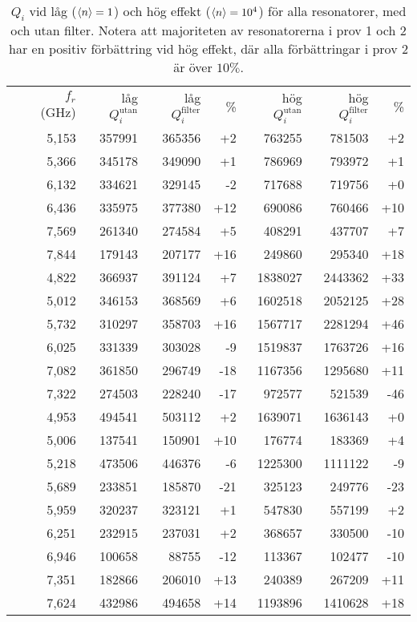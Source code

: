 \documentclass[main.tex]{subfiles}
\begin{document}
\begin{table}[h]
\centering
\caption{$Q_i$ vid låg ($\expval{n}=1$) och hög effekt ($\expval{n}=10^4$) för alla resonatorer, med och utan filter. Notera att majoriteten av resonatorerna i prov 1 och 2 har en positiv förbättring vid hög effekt, där alla förbättringar i prov 2 är över $10 \%$.}
\label{tab:Qi_A}


\begin{tabular}{crrrrrrr}
\toprule
 & $f_r$ (\unit{GHz}) & låg $Q_i^{\text{utan}}$ & låg $Q_i^{\text{filter}}$ &  \% & hög $Q_i^{\text{utan}}$ & hög $Q_i^{\text{filter}}$ &  \% \\
\cmidrule{2-8}

\parbox[t]{2mm}{}
& 5,153 & 357991 & 365356 & +2 & 763255 & 781503 & +2 \\
 & 5,366 & 345178 & 349090 & +1 & 786969 & 793972 & +1 \\ 
 & 6,132 & 334621 & 329145 & -2 & 717688 & 719756 & +0 \\ 
 & 6,436 & 335975 & 377380 & +12 & 690086 & 760466 & +10 \\ 
 & 7,569 & 261340 & 274584 & +5 & 408291 & 437707 & +7 \\
 & 7,844 & 179143 & 207177 & +16 & 249860 & 295340 & +18\\

\parbox[t]{2mm}{}
& 4,822 & 366937 & 391124 & +7 & 1838027 & 2443362 & +33 \\
& 5,012 & 346153 & 368569 & +6 & 1602518 & 2052125 & +28 \\
& 5,732 & 310297 & 358703 & +16 & 1567717 & 2281294 & +46 \\
& 6,025 & 331339 & 303028 & -9 & 1519837 & 1763726 & +16 \\
& 7,082 & 361850 & 296749 & -18 & 1167356 & 1295680 & +11 \\
& 7,322 & 274503 & 228240 & -17 & 972577 & 521539 & -46 \\

\parbox[t]{2mm}{}
& 4,953 & 494541 & 503112 & +2 & 1639071 & 1636143 & +0 \\
& 5,006 & 137541 & 150901 & +10 & 176774 & 183369 & +4 \\
& 5,218 & 473506 & 446376 & -6 & 1225300 & 1111122 & -9 \\
& 5,689 & 233851 & 185870 & -21 & 325123 & 249776 & -23 \\
& 5,959 & 320237 & 323121 & +1 & 547830 & 557199 & +2 \\
& 6,251 & 232915 & 237031 & +2 & 368657 & 330500 & -10 \\
& 6,946 & 100658 & 88755 & -12 & 113367 & 102477 & -10 \\
& 7,351 & 182866 & 206010 & +13 & 240389 & 267209 & +11 \\
& 7,624 & 432986 & 494658 & +14 & 1193896 & 1410628 & +18\\
\bottomrule
\end{tabular}
\end{table}
\end{document}

